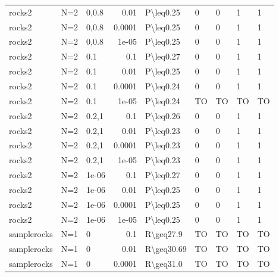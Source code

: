 \begin{longtable}{lllrlllll}
 rocks2        & N=2       & 0,0.8 & 0.01   & P\textbackslash{}leq0.25  & 0    & 0    & 1        & 1       \\
 rocks2        & N=2       & 0,0.8 & 0.0001 & P\textbackslash{}leq0.25  & 0    & 0    & 1        & 1       \\
 rocks2        & N=2       & 0,0.8 & 1e-05  & P\textbackslash{}leq0.25  & 0    & 0    & 1        & 1       \\
 rocks2        & N=2       & 0.1   & 0.1    & P\textbackslash{}leq0.27  & 0    & 0    & 1        & 1       \\
 rocks2        & N=2       & 0.1   & 0.01   & P\textbackslash{}leq0.25  & 0    & 0    & 1        & 1       \\
 rocks2        & N=2       & 0.1   & 0.0001 & P\textbackslash{}leq0.24  & 0    & 0    & 1        & 1       \\
 rocks2        & N=2       & 0.1   & 1e-05  & P\textbackslash{}leq0.24  & TO   & TO   & TO       & TO      \\
 rocks2        & N=2       & 0.2,1 & 0.1    & P\textbackslash{}leq0.26  & 0    & 0    & 1        & 1       \\
 rocks2        & N=2       & 0.2,1 & 0.01   & P\textbackslash{}leq0.23  & 0    & 0    & 1        & 1       \\
 rocks2        & N=2       & 0.2,1 & 0.0001 & P\textbackslash{}leq0.23  & 0    & 0    & 1        & 1       \\
 rocks2        & N=2       & 0.2,1 & 1e-05  & P\textbackslash{}leq0.23  & 0    & 0    & 1        & 1       \\
 rocks2        & N=2       & 1e-06 & 0.1    & P\textbackslash{}leq0.27  & 0    & 0    & 1        & 1       \\
 rocks2        & N=2       & 1e-06 & 0.01   & P\textbackslash{}leq0.25  & 0    & 0    & 1        & 1       \\
 rocks2        & N=2       & 1e-06 & 0.0001 & P\textbackslash{}leq0.25  & 0    & 0    & 1        & 1       \\
 rocks2        & N=2       & 1e-06 & 1e-05  & P\textbackslash{}leq0.25  & 0    & 0    & 1        & 1       \\
 samplerocks   & N=1       & 0     & 0.1    & R\textbackslash{}geq27.9  & TO   & TO   & TO       & TO      \\
 samplerocks   & N=1       & 0     & 0.01   & R\textbackslash{}geq30.69 & TO   & TO   & TO       & TO      \\
 samplerocks   & N=1       & 0     & 0.0001 & R\textbackslash{}geq31.0  & TO   & TO   & TO       & TO      \\

\end{longtable}
